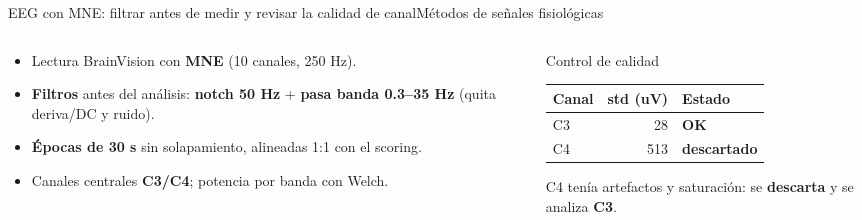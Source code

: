 \documentclass[aspectratio=169,11pt,t]{beamer}
\begin{document}
\begin{frame}{EEG con MNE: filtrar antes de medir y revisar la calidad de canal}{Métodos de señales fisiológicas}
  \begin{columns}[T,onlytextwidth]
    \begin{column}{0.58\textwidth}
      \begin{itemize}\setlength\itemsep{4pt}
        \item Lectura BrainVision con \textbf{MNE} (10 canales, 250 Hz).
        \item \textbf{Filtros} antes del análisis: \textbf{notch 50 Hz} + \textbf{pasa banda 0.3--35 Hz} (quita deriva/DC y ruido).
        \item \textbf{Épocas de 30 s} sin solapamiento, alineadas 1:1 con el scoring.
        \item Canales centrales \textbf{C3/C4}; potencia por banda con Welch.
      \end{itemize}
    \end{column}
    \begin{column}{0.42\textwidth}
      \begin{block}{Control de calidad}
        \footnotesize
        \begin{tabular}{lrl}
          \toprule
          Canal & std (uV) & Estado\\
          \midrule
          C3 & 28 & \textbf{\color{good}OK}\\
          C4 & 513 & \textbf{\color{warn}descartado}\\
          \bottomrule
        \end{tabular}\par\vskip4pt
        C4 tenía artefactos y saturación: se \textbf{descarta} y se analiza \textbf{C3}.
      \end{block}
    \end{column}
  \end{columns}
\end{frame}
\end{document}
